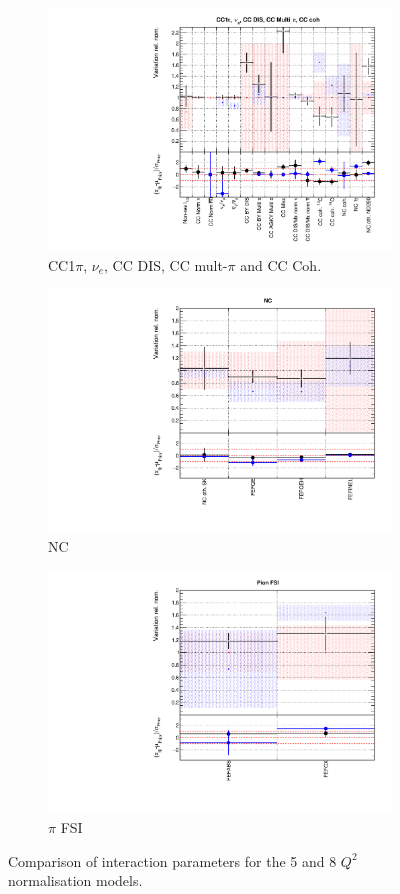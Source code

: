 \begin{figure}
\begin{subfigure}{0.49\textwidth}
  \centering
  \includegraphics[width=0.9\linewidth]{figs/comp5q2vs8q2xsec3}
  \caption{CC1$\pi$, $\nu_e$, CC DIS, CC mult-$\pi$ and CC Coh.}
\end{subfigure}
\begin{subfigure}{0.49\textwidth}
  \centering
  \includegraphics[width=0.9\linewidth]{figs/comp5q2vs8q2xsec4}
  \caption{NC}
\end{subfigure}
\begin{subfigure}{0.49\textwidth}
  \centering
  \includegraphics[width=0.9\linewidth]{figs/comp5q2vs8q2xsec5}
  \caption{$\pi$ FSI}
\end{subfigure}
\caption{Comparison of interaction parameters for the 5 and 8 $Q^2$ normalisation models.}
\label{fig:comp5q2vs8q2xsec}
\end{figure}

